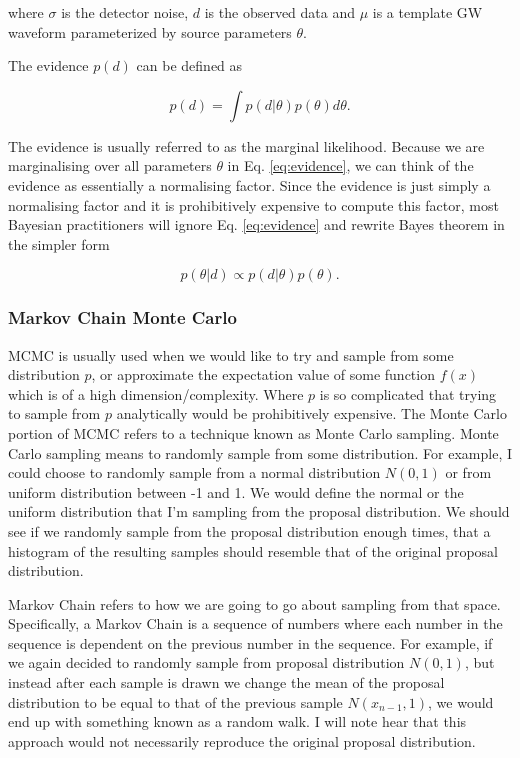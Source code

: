 where $\sigma$ is the detector noise, $d$ is the observed data and $\mu$ is a template \ac{GW} waveform parameterized by source parameters $\theta$. 

%
%
The evidence $p(d)$ can be defined as 

\begin{equation}
    p(d) = \int p(d|\theta) p(\theta) d\theta.
    \label{eq:evidence}
\end{equation}

The evidence is usually referred to as the marginal likelihood. Because we are marginalising over all parameters $\theta$ in Eq. \ref{eq:evidence}, we can think of the evidence as essentially a normalising factor. Since the evidence is just simply a normalising factor and it is prohibitively expensive to compute this factor, most Bayesian practitioners will ignore Eq. \ref{eq:evidence} and rewrite Bayes theorem in the simpler form 

\begin{equation}
    p(\theta | d) \propto p(d | \theta) p(\theta).
\end{equation}

\subsubsection{Markov Chain Monte Carlo}

%
\ac{MCMC} is usually used when we would like to try and sample from some distribution $p$, or approximate the expectation value of some function $f(x)$ which is of a high dimension/complexity. Where $p$ is so complicated that trying to sample from $p$ analytically would be prohibitively expensive. The Monte Carlo portion of \ac{MCMC} refers to a technique known as Monte Carlo sampling. Monte Carlo sampling means to randomly sample from some distribution. For example, I could choose to randomly sample from a normal distribution $N(0,1)$ or from uniform distribution between -1 and 1. We would define the normal or the uniform distribution that I'm sampling from the proposal distribution. We should see if we randomly sample from the proposal distribution enough times, that a histogram of the resulting samples should resemble that of the original proposal distribution. 

%
%
Markov Chain refers to how we are going to go about sampling from that space. Specifically, a Markov Chain is a sequence of numbers where each number in the sequence is dependent on the previous number in the sequence. For example, if we again decided to randomly sample from proposal distribution $N(0,1)$, but instead after each sample is drawn we change the mean of the proposal distribution to be equal to that of the previous sample $N(x_{n-1},1)$, we would end up with something known as a random walk. I will note hear that this approach would not necessarily reproduce the original proposal distribution.

